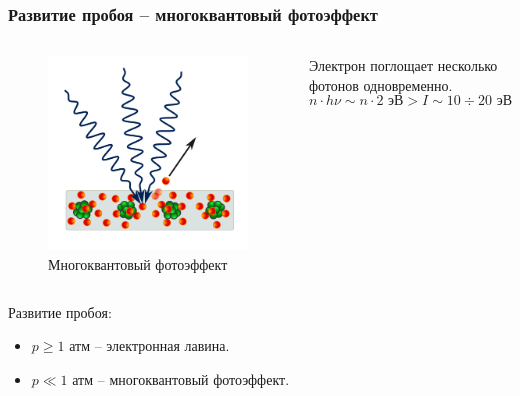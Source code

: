 \documentclass{beamer}
\begin{document}
	\begin{frame}
		\frametitle{Развитие пробоя -- многоквантовый фотоэффект}
		
		\begin{columns}
			\begin{figure}
				\centering
				\includegraphics[width=0.9\linewidth]{res/multiphoton.png}
				\caption*{Многоквантовый фотоэффект}
			\end{figure}
		
			Электрон поглощает несколько фотонов одновременно. 
			$$n \cdot h\nu \sim n \cdot 2 \text{ эВ} > I \sim 10 \div 20 \text{ эВ}$$
		\end{columns}
	
		Развитие пробоя:
		\begin{itemize}
			\item $p \geqslant 1\text{ атм}$ -- электронная лавина.
			\item $p \ll 1\text{ атм}$ -- многоквантовый фотоэффект.
		\end{itemize}
	\end{frame}
	
\end{document}
